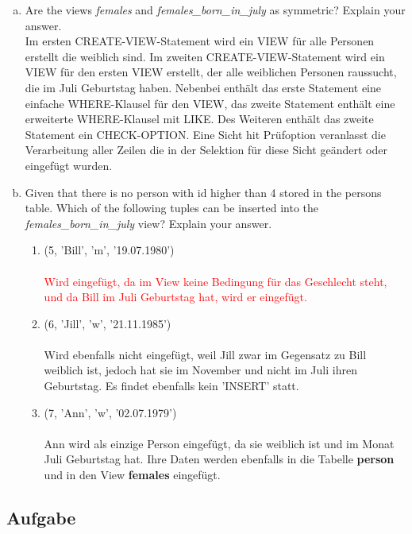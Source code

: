 \documentclass[11pt,a4paper,DIV=9]{scrartcl}
\newcounter{temp}
\newcommand{\aufgabe}[1]{
  \setcounter{temp}{\value{subsection}}
  \setcounter{subsection}{#1}
  \addtocounter{subsection}{-1}
  \subsection{Aufgabe}
  \setcounter{subsection}{\value{temp}}
}
\begin{document}
  \begin{enumerate}[a.]
  \item Are the views \textit{females} and \textit{females\_born\_in\_july} as symmetric? Explain your answer. \\
  Im ersten CREATE-VIEW-Statement wird ein VIEW f\"ur alle Personen erstellt die weiblich sind.
  Im zweiten CREATE-VIEW-Statement wird ein VIEW f\"ur den ersten VIEW erstellt, der alle weiblichen Personen raussucht, die im Juli Geburtstag haben. Nebenbei enth\"alt das erste Statement eine einfache WHERE-Klausel f\"ur den VIEW, das zweite Statement enth\"alt eine erweiterte WHERE-Klausel mit LIKE. Des Weiteren enth\"alt das zweite Statement ein CHECK-OPTION. Eine Sicht hit Pr\"ufoption veranlasst die Verarbeitung aller Zeilen die in der Selektion f\"ur diese Sicht ge\"andert oder eingef\"ugt wurden.  \item Given that there is no person with id higher than 4 stored in the persons table. Which of the following tuples can be inserted into the \textit{females\_born\_in\_july} view? Explain your answer.
  \begin{enumerate}[1.]
  \item (5, 'Bill', 'm', '19.07.1980')
  \\\\\textcolor{red}{Wird eingef\"ugt, da im View keine Bedingung f\"ur das Geschlecht steht, und da Bill im Juli Geburtstag hat, wird er eingef\"ugt.}
  \item (6, 'Jill', 'w', '21.11.1985')
  \\\\Wird ebenfalls nicht eingef\"ugt, weil Jill zwar im Gegensatz zu Bill weiblich ist, jedoch hat sie im November und nicht im Juli ihren Geburtstag. Es findet ebenfalls kein 'INSERT' statt.
  \item (7, 'Ann', 'w', '02.07.1979')
  \\\\Ann wird als einzige Person eingef\"ugt, da sie weiblich ist und im Monat Juli Geburtstag hat. Ihre Daten werden ebenfalls in die Tabelle \textbf{person} und in den View \textbf{females} eingef\"ugt.
  \end{enumerate}
  \end{enumerate}
  \aufgabe{3}
\end{document}
